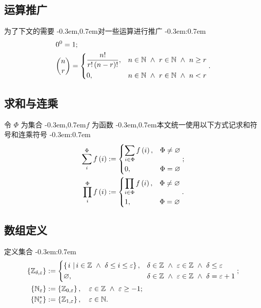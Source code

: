 \documentclass{article}
\newcommand\BrSetN[1]{\Set{\MathPartialSetN{#1}}}
\newcommand\BrSetU[1]{\Set{\MathPartialSetU{#1}}}
\newcommand\BrSetZ[2]{\Set{\MathPartialSetZ{#1}{#2}}}
\newcommand\InSetN[1]{\InSet{#1}{\MathSetN}}
\newcommand\InSetZ[1]{\InSet{#1}{\MathSetZ}}
\newcommand\MathPartialSetN[1]{\mathbb{N}_{#1}}
\newcommand\MathPartialSetU[1]{\mathbb{N}^{\ast}_{#1}}
\newcommand\MathPartialSetZ[2]{\mathbb{Z}_{\MultiSub{#1}{#2}}}
\newcommand\MathSetN{\mathbb{N}}
\newcommand\MathSetZ{\mathbb{Z}}
\newcommand\Bracket[1]{\left( #1 \right)}
\newcommand\BracketBig[1]{\left\{ #1 \right\}}
\newcommand\CaseDomain[1]{\DomainComma & #1}
\newcommand\Colon{:}
\newcommand\Comma{,}
\newcommand\CommaSub{\Comma}
\newcommand\DefineAs{:=}
\newcommand\Domain[1]{\DomainComma \quad #1}
\newcommand\DomainAnd{\LogicAnd}
\newcommand\DomainComma{\Comma}
\newcommand\EmptySet{\varnothing}
\newcommand\Func[2]{#1 \Bracket{#2}}
\newcommand\InSet[2]{#1 \in #2}
\newcommand\Logic[1]{\ #1\ }
\newcommand\LogicAnd{\Logic{\wedge}}
\newcommand\MultiSub[2]{#1 \CommaSub #2}
\newcommand\Set[1]{\BracketBig{#1}}
\newcommand\SetDefAnd{\LogicAnd}
\newcommand\SetDefinition[2]{\Set{\left. #1 \ \right| #2}}
\newcommand\EqEndPeriod{.}
\newcommand\EqEndSemicolon{;}
\newcommand\TextColon{\TextPunctuation{\Colon}}
\newcommand\TextComma{\TextPunctuation{\Comma}}
\newcommand\TextPunctuation[1]{\kern -0.3em#1\kern 0.7em}
\begin{document}
	\subsection{运算推广}
	为了下文的需要 \TextComma 对一些运算进行推广 \TextColon
	\begin{align*}
	& 0^{0} = 1 \EqEndSemicolon \\
	& \binom{n}{r} =
	\begin{dcases}
	\frac{n!}{r!\Bracket{n-r}!} \CaseDomain{\InSetN{n} \DomainAnd \InSetN{r} \DomainAnd n \geq r} \\
	0 \CaseDomain{\InSetN{n} \DomainAnd \InSetN{r} \DomainAnd n < r}
	\end{dcases} \EqEndPeriod
	\end{align*}
	
	
	\subsection{求和与连乘}
	令 $\Phi$ 为集合 \TextComma $f$ 为函数 \TextComma 本文统一使用以下方式记求和符号和连乘符号 \TextColon
	\begin{align*}
	\sum_{i}^{\Phi} \Func{f}{i} & \DefineAs
	\begin{dcases}
	\sum_{\InSet{i}{\Phi}} \Func{f}{i} \CaseDomain{\Phi \neq \EmptySet} \\
	0 \CaseDomain{\Phi = \EmptySet}
	\end{dcases} \EqEndSemicolon \\
	\prod_{i}^{\Phi} \Func{f}{i} & \DefineAs
	\begin{dcases}
	\prod_{\InSet{i}{\Phi}} \Func{f}{i} \CaseDomain{\Phi \neq \EmptySet} \\
	1 \CaseDomain{\Phi = \EmptySet}
	\end{dcases} \EqEndPeriod
	\end{align*}
	
	
	\subsection{数组定义}
	定义集合 \TextColon
	\begin{align*}
	\BrSetZ{\delta}{\varepsilon} & \DefineAs
	\begin{dcases}
	\SetDefinition{i}{\InSetZ{i} \SetDefAnd \delta \leq i \leq \varepsilon} \CaseDomain{\InSetZ{\delta} \DomainAnd \InSetZ{\varepsilon} \DomainAnd \delta \leq \varepsilon} \\
	\EmptySet \CaseDomain{\InSetZ{\delta} \DomainAnd \InSetZ{\varepsilon} \DomainAnd \delta = \varepsilon+1}
	\end{dcases} \EqEndSemicolon \\
	\BrSetN{\varepsilon} & \DefineAs \BrSetZ{0}{\varepsilon} \Domain{\InSetZ{\varepsilon} \DomainAnd \varepsilon \geq -1} \EqEndSemicolon \\
	\BrSetU{\varepsilon} & \DefineAs \BrSetZ{1}{\varepsilon} \Domain{\InSetN{\varepsilon}} \EqEndPeriod
	\end{align*}
	
\end{document}
